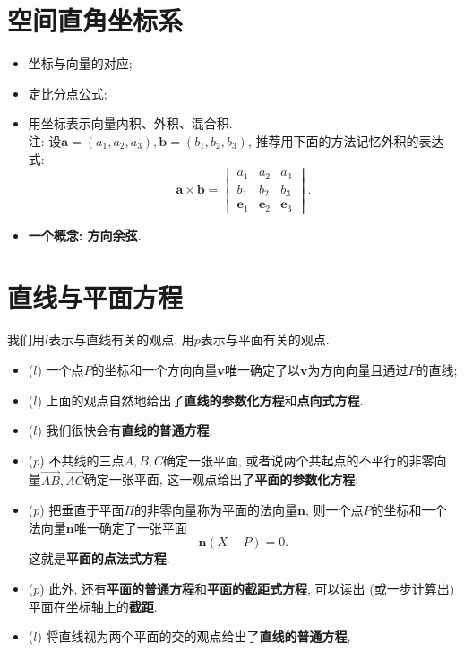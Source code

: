 \documentclass[./main.tex]{subfiles}
\begin{document}
\section{空间直角坐标系}
\begin{itemize}
    \item 坐标与向量的对应; 
    \item 定比分点公式; 
    \item 用坐标表示向量内积、外积、混合积.\\注: 设$\mathbf{a}=(a_1,a_2,a_3),\mathbf{b}=(b_1,b_2,b_3)$, 推荐用下面的方法记忆外积的表达式: $$\mathbf{a}\times \mathbf{b}=\begin{vmatrix}
    a_1 & a_2 & a_3\\
    b_1 & b_2 & b_3\\
    \mathbf{e}_1 & \mathbf{e}_2 & \mathbf{e}_3
    \end{vmatrix}.$$
    \item \textbf{一个概念: 方向余弦}.
\end{itemize}

\section{直线与平面方程}
我们用$l$表示与直线有关的观点, 用$p$表示与平面有关的观点.
\begin{itemize}
    \item  ($l$) 一个点$P$的坐标和一个方向向量$\mathbf{v}$唯一确定了以$\mathbf{v}$为方向向量且通过$P$的直线; 
    \item  ($l$) 上面的观点自然地给出了\textbf{直线的参数化方程}和\textbf{点向式方程}.
    \item  ($l$) 我们很快会有\textbf{直线的普通方程}.
    \item  ($p$) 不共线的三点$A,B,C$确定一张平面, 或者说两个共起点的不平行的非零向量$\overrightarrow{AB},\overrightarrow{AC}$确定一张平面, 这一观点给出了\textbf{平面的参数化方程}; 
    \item  ($p$) 把垂直于平面$\Pi$的非零向量称为平面的法向量$\mathbf{n}$, 则一个点$P$的坐标和一个法向量$\mathbf{n}$唯一确定了一张平面$$\mathbf{n}(X-P)=0.$$这就是\textbf{平面的点法式方程}.
    \item  ($p$) 此外, 还有\textbf{平面的普通方程}和\textbf{平面的截距式方程}, 可以读出 (或一步计算出) 平面在坐标轴上的\textbf{截距}.
    \item  ($l$) 将直线视为两个平面的交的观点给出了\textbf{直线的普通方程},
\end{itemize}
\end{document}
